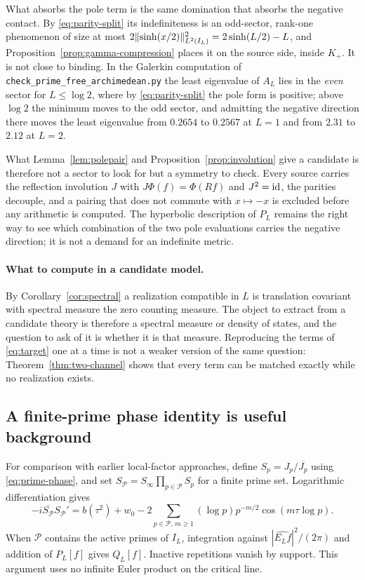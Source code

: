 What absorbs the pole term is the same domination that absorbs the negative
contact. By \eqref{eq:parity-split} its indefiniteness is an odd-sector,
rank-one phenomenon of size at most
$2\lVert \sinh(x/2)\rVert_{L^2(I_L)}^2=2\sinh(L/2)-L$, and
Proposition~\ref{prop:gamma-compression} places it on the source side, inside
$K_+$. It is not close to binding. In the Galerkin computation of
\texttt{check\_prime\_free\_archimedean.py} the least eigenvalue of $A_L$ lies
in the \emph{even} sector for $L\leq\log2$, where by \eqref{eq:parity-split}
the pole form is positive; above $\log2$ the minimum moves to the odd sector,
and admitting the negative direction there moves the least eigenvalue from
$0.2654$ to $0.2567$ at $L=1$ and from $2.31$ to $2.12$ at $L=2$.

What Lemma~\ref{lem:polepair} and Proposition~\ref{prop:involution} give a
candidate is therefore not a sector to look for but a symmetry to check. Every
source carries the reflection involution $J$ with $J\Phi(f)=\Phi(Rf)$ and
$J^2=\mathrm{id}$, the parities decouple, and a pairing that does not commute with
$x\mapsto-x$ is excluded before any arithmetic is computed. The hyperbolic
description of $P_L$ remains the right way to see which combination of the two
pole evaluations carries the negative direction; it is not a demand for an
indefinite metric.

\paragraph{What to compute in a candidate model.}
By Corollary~\ref{cor:spectral} a realization compatible in $L$ is
translation covariant with spectral measure the zero counting measure. The
object to extract from a candidate theory is therefore a spectral measure or
density of states, and the question to ask of it is whether it is that
measure. Reproducing the terms of \eqref{eq:target} one at a time is not a
weaker version of the same question: Theorem~\ref{thm:two-channel} shows that
every term can be matched exactly while no realization exists.

\subsection{A finite-prime phase identity is useful background}
For comparison with earlier local-factor approaches, define
$S_p=J_p/\overline{J_p}$ using \eqref{eq:prime-phase}, and set
$S_{\mathcal P}=S_\infty\prod_{p\in\mathcal P}S_p$ for a finite prime
set. Logarithmic differentiation gives
\begin{equation}\label{eq:finite-phase}
 -i\overline{S_{\mathcal P}}S_{\mathcal P}'
 =b(\tau^2)+w_0
 -2\sum_{p\in\mathcal P,\,m\geq1}(\log p)p^{-m/2}
                         \cos(m\tau\log p).
\end{equation}
When $\mathcal P$ contains the active primes of $I_L$, integration
against $|\widehat{E_Lf}|^2/(2\pi)$ and addition of $P_L[f]$ gives
$Q_L[f]$. Inactive repetitions vanish by support. This argument uses
no infinite Euler product on the critical line.

